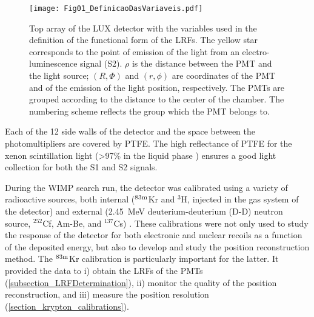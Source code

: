 \documentclass[a4paper,11pt]{article}
\begin{document}
\begin{figure}
 \begin{center}
  \texttt{[image: Fig01\_DefinicaoDasVariaveis.pdf]}
  \caption{Top array of the LUX detector with the variables used in the definition of the functional form of the LRFs. The yellow star corresponds to the point of emission of the light from an electro-luminescence signal (S2). $\rho$ is the distance between the PMT and the light source;  $(R, \Phi)$ and $(r, \phi)$ are coordinates of the PMT and of the emission of the light position, respectively.  The PMTs are grouped according to the distance to the center of the chamber. The numbering scheme reflects the group which the PMT belongs to.
  }
  \label{Fig01_DefinicaoDasVariaveis}
 \end{center}
\end{figure}

Each  of the 12 side walls of the detector and the space between the photomultipliers are covered by PTFE. The high reflectance of PTFE for the xenon scintillation light (>97\%  in the liquid phase \cite{FranciscoNeves2017_Reflectancia}) ensures a good light collection for both the S1 and S2 signals.

 During the WIMP search run, the detector was calibrated using a variety of radioactive sources, both internal (${}^{\rm 83m}$Kr and ${}^{3}$H, injected in the gas system of the detector) and external (2.45~MeV deuterium-deuterium (D-D) neutron source, ${}^{252}$Cf,  Am-Be, and ${}^{137}$Cs) \cite{LUX2015_ReanalysisPRD}. These calibrations were not only used to study the response of the detector for both electronic and nuclear recoils as a function of the deposited energy, but also to develop and study the position reconstruction method. The ${}^{\rm 83m}$Kr calibration is particularly important for the latter. It provided the data to i) obtain the LRFs of the PMTs (\cref{subsection_LRFDetermination}), ii) monitor the quality of the position reconstruction, and iii) measure the position resolution (\cref{section_krypton_calibrations}). 
 
\end{document}
